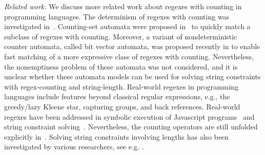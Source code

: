 \medskip
\noindent
\emph{Related work.} 
We discuss more related work about regexes with counting in programming languages.  
The determinism of regexes with counting was investigated in~\cite{GGM12,CL15}. Counting-set automata were proposed in~\cite{redos_lenka,HS+23} to quickly match a subclass of regexes with counting. Moreover, a variant of nondeterministic counter automata, called bit vector automata, was proposed recently in \cite{GKM23} to enable fast matching of a more expressive class of regexes with counting.   Nevertheless, the nonemptiness problem of these automata was not considered, and it is unclear whether these automata models can be used for solving string constraints with regex-counting and string-length.
Real-world regexes in programming languages include features beyond classical regular expressions, e.g., the greedy/lazy Kleene star, capturing groups, and back references. Real-world regexes have been addressed in symbolic execution of Javascript programs~\cite{LMK19} and string constraint solving~\cite{CF+22}. Nevertheless, the counting operators are still unfolded explicitly in~\cite{CF+22}.  Solving string constraints involving lengths has also been investigated by various researchers, see e.g. \cite{WC+18,atva2020,z3str3re}.


